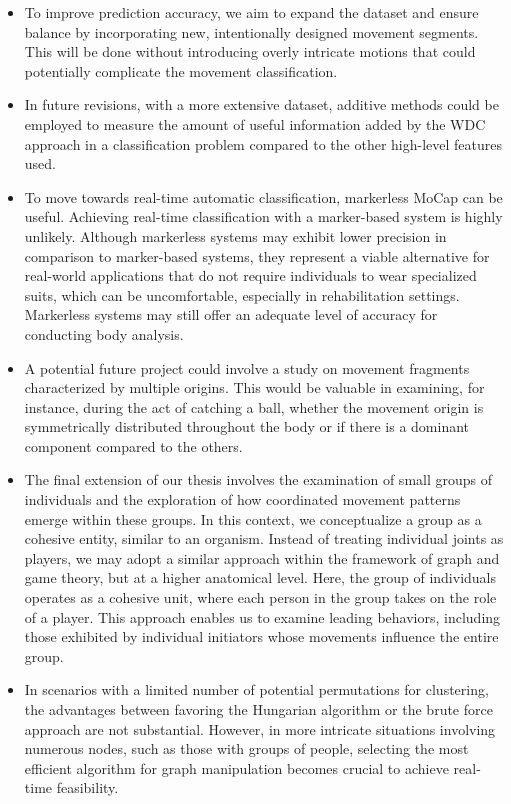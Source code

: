 \begin{itemize}
    \item To improve prediction accuracy, we aim to expand the dataset and ensure balance by incorporating new, intentionally designed movement segments.
        This will be done without introducing overly intricate motions that could potentially complicate the movement classification.
    \item In future revisions, with a more extensive dataset, additive methods could be employed to measure the amount of useful information added by the WDC approach in a classification problem compared to the other high-level features used.
    \item To move towards real-time automatic classification, markerless MoCap can be useful.
        Achieving real-time classification with a marker-based system is highly unlikely.
        Although markerless systems may exhibit lower precision in comparison to marker-based systems, 
        they represent a viable alternative for real-world applications that do not require individuals to wear specialized suits, which can be uncomfortable, especially in rehabilitation settings. 
        Markerless systems may still offer an adequate level of accuracy for conducting body analysis.
    \item A potential future project could involve a study on movement fragments characterized by multiple origins.
        This would be valuable in examining, for instance, during the act of catching a ball, whether the movement origin is symmetrically distributed throughout the body or if there is a dominant component compared to the others.
    \item The final extension of our thesis involves the examination of small groups of individuals and the exploration of how coordinated movement patterns emerge within these groups.
        In this context, we conceptualize a group as a cohesive entity, similar to an organism.
        Instead of treating individual joints as players, we may adopt a similar approach within the framework of graph and game theory, but at a higher anatomical level.
        Here, the group of individuals operates as a cohesive unit, where each person in the group takes on the role of a player. 
        This approach enables us to examine leading behaviors, including those exhibited by individual initiators whose movements influence the entire group.
    \item In scenarios with a limited number of potential permutations for clustering, the advantages between favoring the Hungarian algorithm or the brute force approach are not substantial. 
        However, in more intricate situations involving numerous nodes, such as those with groups of people, selecting the most efficient algorithm for graph manipulation becomes crucial to achieve real-time feasibility.
\end{itemize}